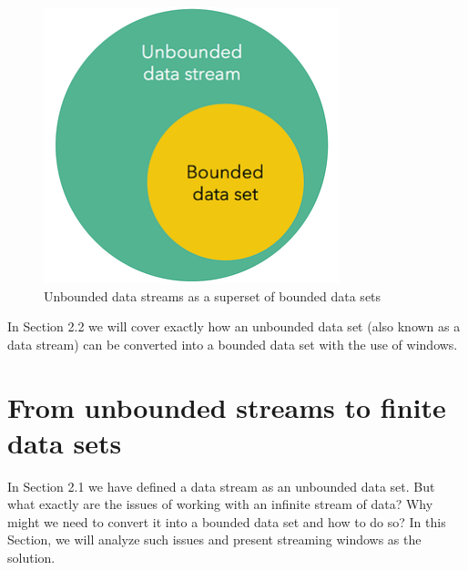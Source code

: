 \begin{figure}[!htb]
    \begin{center}
      \includegraphics[scale=0.7]{figures/unbounded-superset-bounded.png}
      \caption{Unbounded data streams as a superset of bounded data sets}
      \label{fig:unbounded-bounded-superset}
    \end{center}
\end{figure}


In Section 2.2 we will cover exactly how an unbounded data set (also known as a data stream) can be converted into a bounded data set with the use of windows.



\section{From unbounded streams to finite data sets} \label{sec:windows}

In Section 2.1 we have defined a data stream as an unbounded data set. But what exactly are the issues of working with an infinite stream of data? Why might we need to convert it into a bounded data set and how to do so? In this Section, we will analyze such issues and present streaming windows as the solution.

